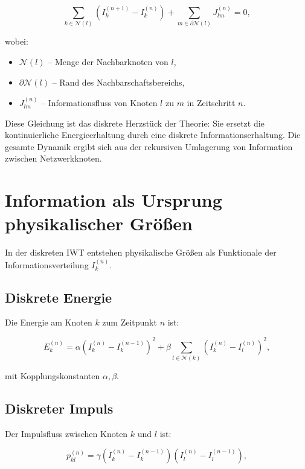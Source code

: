 \[
\sum_{k \in \mathcal{N}(l)} \left( I_k^{(n+1)} - I_k^{(n)} \right) + \sum_{m \in \partial \mathcal{N}(l)} J_{lm}^{(n)} = 0,
\]

wobei:

\begin{itemize}
    \item \( \mathcal{N}(l) \) – Menge der Nachbarknoten von \( l \),
    \item \( \partial \mathcal{N}(l) \) – Rand des Nachbarschaftsbereichs,
    \item \( J_{lm}^{(n)} \) – Informationsfluss von Knoten \( l \) zu \( m \) in Zeitschritt \( n \).
\end{itemize}

Diese Gleichung ist das diskrete Herzstück der Theorie: Sie ersetzt die kontinuierliche Energieerhaltung durch eine diskrete Informationserhaltung. Die gesamte Dynamik ergibt sich aus der rekursiven Umlagerung von Information zwischen Netzwerkknoten.

\section{Information als Ursprung physikalischer Größen}
\label{sec:information_als_ursprung}

In der diskreten IWT entstehen physikalische Größen als Funktionale der Informationsverteilung \( I_k^{(n)} \).

\subsection{Diskrete Energie}
\label{sub:diskrete_energie}

Die Energie am Knoten \( k \) zum Zeitpunkt \( n \) ist:

\[
E_k^{(n)} = \alpha \left( I_k^{(n)} - I_k^{(n-1)} \right)^2 + \beta \sum_{l \in \mathcal{N}(k)} \left( I_k^{(n)} - I_l^{(n)} \right)^2,
\]

mit Kopplungskonstanten \( \alpha, \beta \).

\subsection{Diskreter Impuls}
\label{sub:diskreter_impuls}

Der Impulsfluss zwischen Knoten \( k \) und \( l \) ist:

\[
p_{kl}^{(n)} = \gamma \left( I_k^{(n)} - I_k^{(n-1)} \right) \left( I_l^{(n)} - I_l^{(n-1)} \right),
\]

